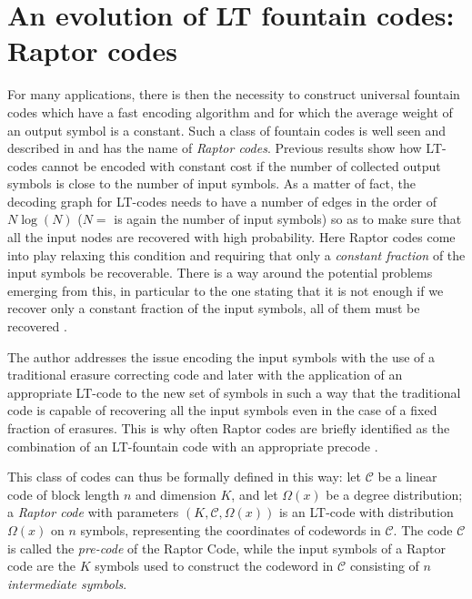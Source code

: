 \section{An evolution of LT fountain codes: Raptor codes}
\label{sec:raptor}
For many applications, there is then the necessity to construct universal fountain codes which have a fast encoding algorithm and for which the average weight of an output symbol is a constant. Such a class of fountain codes is well seen and described in \cite{Shokrollahi2006} and has the name of \textit{Raptor codes}. Previous results show how LT-codes cannot be encoded with constant cost if the number of collected output symbols is close to the number of input symbols. As a matter of fact, the decoding graph for LT-codes needs to have a number of edges in the order of $N\log(N)$ ($N =$ is again the number of input symbols) so as to make sure that all the input nodes are recovered with high probability. Here Raptor codes come into play relaxing this condition and requiring that only a \textit{constant fraction} of the input symbols be recoverable. There is a way around the potential problems emerging from this, in particular to the one stating that it is not enough if we recover only a constant fraction of the input symbols, all of them must be recovered \cite{Luby}.

The author addresses the issue encoding the input symbols with the use of a traditional erasure correcting code and later with the application of an appropriate LT-code to the new set of symbols in such a way that the traditional code is capable of recovering all the input symbols even in the case of a fixed fraction of erasures. This is why often Raptor codes are briefly identified as the combination of an LT-fountain code with an appropriate precode \cite{Etesami2006}.

This class of codes can thus be formally defined in this way: let $\mathcal{C}$ be a linear code of block length $n$ and dimension $K$, and let $\Omega(x)$ be a degree distribution; a \textit{Raptor code} with parameters $(K,\mathcal{C},\Omega(x))$ is an LT-code with distribution $\Omega(x)$ on $n$ symbols, representing the coordinates of codewords in $\mathcal{C}$. The code $\mathcal{C}$ is called the \textit{pre-code} of the Raptor Code, while the input symbols of a Raptor code are the $K$ symbols used to construct the codeword in $\mathcal{C}$ consisting of $n$ \textit{intermediate symbols}.
